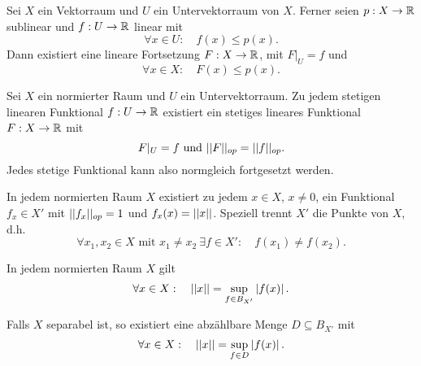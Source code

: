 \begin{theorem}
    Sei $X$ ein Vektorraum und $U$ ein Untervektorraum von $X$. Ferner seien $p: X \to \mathbb{R}$ sublinear und $f: U \to \mathbb{R}$ linear mit 
    $$
       \forall x \in U: \quad f(x) \leq p(x).
    $$
    Dann existiert eine lineare Fortsetzung $F:X \to \mathbb{R}$, mit $F|_U = f$ und
    $$
    \forall x \in X: \quad F(x) \leq p(x). 
    $$ 
\end{theorem}

\begin{theorem}
    Sei $X$ ein normierter Raum und $U$ ein Untervektorraum. 
    Zu jedem stetigen linearen Funktional $f:U \to \mathbb{R}$ existiert ein stetiges lineares Funktional $F:X \to \mathbb{R}$ mit 
    $$
        F|_U = f \text{ und } \lvert\lvert F \rvert\rvert_{op} = \lvert\lvert f \rvert\rvert_{op}.
    $$
    Jedes stetige Funktional kann also normgleich fortgesetzt werden.
\end{theorem}

\begin{corollary}
    In jedem normierten Raum $X$ existiert zu jedem $x \in X$, $x \neq 0$, ein Funktional $f_x \in X'$ mit $\lvert\lvert f_x \rvert\rvert_{op} = 1$ und $f_x(x) = \lvert\lvert x \rvert\rvert$. 
    Speziell trennt $X'$  die Punkte von $X$, d.h.
    $$
        \forall x_1, x_2 \in X \text{ mit } x_1 \neq x_2 \ \exists f \in X': \quad f(x_1) \neq f(x_2). 
    $$
\end{corollary}

\begin{corollary}
    In jedem normierten Raum $X$ gilt 
    $$
        \forall x \in X : \quad \lvert\lvert x \rvert\rvert = \sup_{f \in B_{X'}}\left| f(x) \right|.
    $$
\end{corollary}

\begin{corollary}
    Falls $X$ separabel ist, so existiert eine abzählbare Menge $D \subseteq B_{X'}$ mit 
    $$
        \forall x \in X : \quad \lvert\lvert x \rvert\rvert = \sup_{f \in D}\left| f(x) \right|. 
    $$
\end{corollary}

